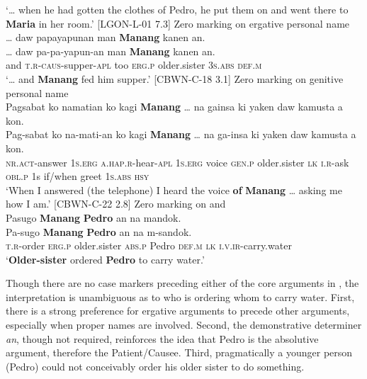\glt `… when he had gotten the clothes of Pedro, he put them on and went there to \textbf{Maria} in her room.’ [LGON-L-01 7.3]
\z
\ea
Zero marking on ergative personal name \\
… daw  papayapunan  man \textbf{Manang}  kanen  an. \\\smallskip
 \gll … daw  pa-pa-yapun-an  man \emptyset{} \textbf{Manang}  kanen  an. \\
{} and  \textsc{t.r-caus}-supper-\textsc{apl}  too \textsc{erg.p} older.sister  \textsc{3}\textsc{s.abs}  \textsc{def.m} \\
\glt ‘… and \textbf{Manang} fed him supper.’ [CBWN-C-18 3.1]
\z
\ea
Zero marking on genitive personal name \\
Pagsabat  ko  namatian  ko  kagi \textbf{Manang} … na  gainsa  ki  yaken  daw  kamusta  a  kon. \\\smallskip
 \gll Pag-sabat  ko  na-mati-an  ko  kagi \emptyset{} \textbf{Manang} … na  ga-insa  ki  yaken  daw  kamusta  a  kon. \\
\textsc{nr.act}-answer  \textsc{1}\textsc{s.erg} \textsc{a.hap.r}-hear-\textsc{apl}  1\textsc{s.erg} voice  \textsc{gen.p} older.sister {} \textsc{lk}  \textsc{i.r}-ask  \textsc{obl.p}  1s if/when  greet  1\textsc{s.abs}  \textsc{hsy} \\
\glt `When I answered (the telephone) I heard the voice \textbf{of} \textbf{Manang} … asking me how I am.’ [CBWN-C-22 2.8]
\z
\ea
\label{bkm:Ref329345305}
Zero marking on  and    \\
Pasugo \textbf{Manang} \textbf{Pedro}  an  na  mandok. \\\smallskip
 \gll Pa-sugo \emptyset{} \textbf{Manang} \emptyset{} \textbf{Pedro}  an  na  m-sandok. \\
\textsc{t.r}-order \textsc{erg.p} older.sister \textsc{abs.p} Pedro  \textsc{def.m}  \textsc{lk}  \textsc{i.v.ir}-carry.water \\
\glt ‘\textbf{Older-sister} ordered \textbf{Pedro} to carry water.’
\z

Though there are no case markers preceding either of the core arguments in , the interpretation is unambiguous as to who is ordering whom to carry water. First, there is a strong preference for ergative arguments to precede other arguments, especially when proper names are involved. Second, the demonstrative determiner \textit{an}, though not required, reinforces the idea that Pedro is the absolutive argument, therefore the Patient/Causee. Third, pragmatically a younger person (Pedro) could not conceivably order his older sister to do something.

